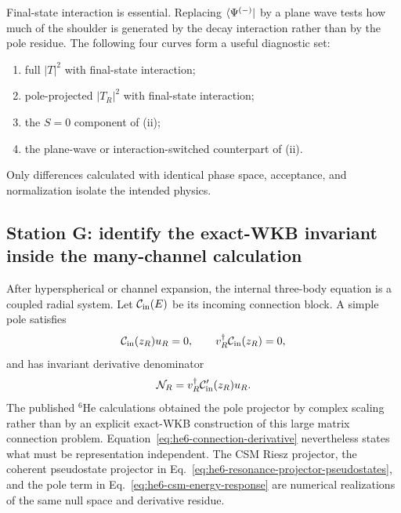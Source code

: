Final-state interaction is essential.  Replacing
$\langle \Psi^{(-)} \rvert$ by a plane wave tests how much of the shoulder is
generated by the decay interaction rather than by the pole residue.  The
following four curves form a useful diagnostic set:
\begin{enumerate}[label=(\roman*)]
  \item full $|T|^2$ with final-state interaction;
  \item pole-projected $|T_R|^2$ with final-state interaction;
  \item the $S=0$ component of (ii);
  \item the plane-wave or interaction-switched counterpart of (ii).
\end{enumerate}
Only differences calculated with identical phase space, acceptance, and
normalization isolate the intended physics.

\subsection{Station G: identify the exact-WKB invariant inside the many-channel calculation}
\label{subsec:he6-exact-wkb-invariant}

After hyperspherical or channel expansion, the internal three-body equation
is a coupled radial system.  Let $\mathcal{C}_{\mathrm{in}}(E)$ be its incoming
connection block.  A simple pole satisfies
\begin{equation}
  \mathcal{C}_{\mathrm{in}}(z_R)u_R=0,
  \qquad
  v_R^\dagger\mathcal{C}_{\mathrm{in}}(z_R)=0,
  \label{eq:he6-connection-null-vectors}
\end{equation}
and has invariant derivative denominator
\begin{equation}
  \mathcal N_R
  =v_R^\dagger
  \mathcal{C}_{\mathrm{in}}'(z_R)u_R.
  \label{eq:he6-connection-derivative}
\end{equation}
The published $^6$He calculations obtained the pole projector by complex
scaling rather than by an explicit exact-WKB construction of this large
matrix connection problem.  Equation~\eqref{eq:he6-connection-derivative}
nevertheless states what must be representation independent.  The CSM Riesz
projector, the coherent pseudostate projector in
Eq.~\eqref{eq:he6-resonance-projector-pseudostates}, and the pole term in
Eq.~\eqref{eq:he6-csm-energy-response} are numerical realizations of the
same null space and derivative residue.

